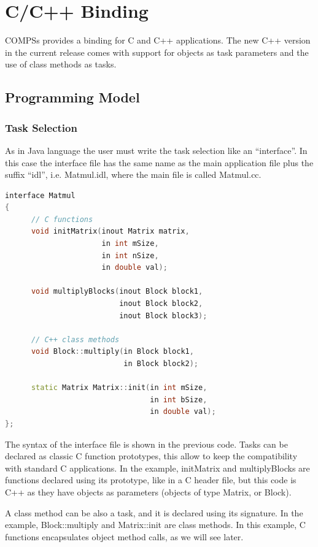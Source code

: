 \section{C/C++ Binding}
\label{sec:C}

COMPSs provides a binding for C and C++ applications. The new C++ version in the current release 
comes with support for objects as task parameters and the use of class methods as tasks.

\subsection{Programming Model}

\subsubsection{Task Selection}
As in Java language the user must write the task selection like an ``interface''. In this case 
the interface file has the same name as the main application file plus the suffix ``idl'', 
i.e. Matmul.idl, where the main file is called Matmul.cc.

\begin{lstlisting}[language=C++]
interface Matmul
{
      // C functions
      void initMatrix(inout Matrix matrix,
                      in int mSize,
                      in int nSize,
                      in double val);
                      
      void multiplyBlocks(inout Block block1,
                          inout Block block2,
                          inout Block block3);
                          
      // C++ class methods
      void Block::multiply(in Block block1,
                           in Block block2);
                           
      static Matrix Matrix::init(in int mSize,
                                 in int bSize,
                                 in double val);
};
\end{lstlisting}

The syntax of the interface file is shown in the previous code. Tasks can be declared as classic 
C function prototypes, this allow to keep the compatibility with standard C applications. 
In the example, initMatrix and multiplyBlocks are functions declared using its prototype, 
like in a C header file, but this code is C++ as they have objects as parameters (objects of 
type Matrix, or Block).

A class method can be also a task, and it is declared using its signature. In the example, 
Block::multiply and Matrix::init are class methods. In this example, C functions encapsulates 
object method calls, as we will see later.

